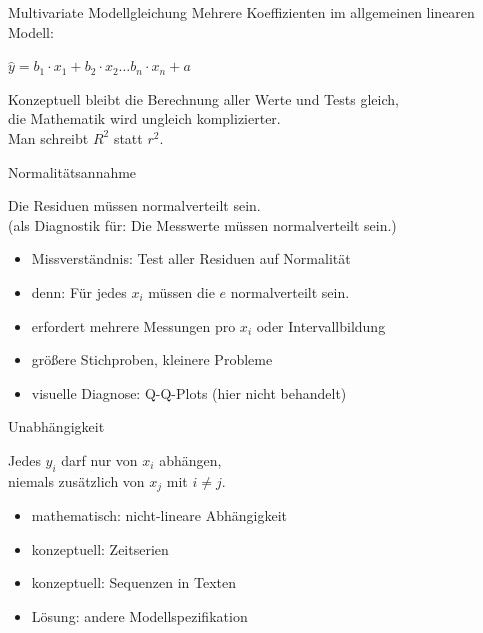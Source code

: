 \begin{frame}
  {Multivariate Modellgleichung}
  Mehrere Koeffizienten im \alert{allgemeinen linearen Modell}:\\
  \pause
  \vspace{0.5cm}
  \begin{center}
    \alert{$\hat{y}=b_1\cdot x_1+b_2\cdot x_2\dots b_n\cdot x_n+a$}
  \end{center}
  \vspace{0.5cm}
  \pause
  Konzeptuell bleibt die Berechnung aller Werte und Tests gleich,\\
  die Mathematik wird ungleich komplizierter.\\
  \vspace{0.5cm}
  \pause
  Man schreibt \alert{$R^2$} statt $r^2$.
\end{frame}

\begin{frame}
  {Normalitätsannahme}
  \begin{center}
    \alert{Die Residuen müssen normalverteilt sein.}\\
    (als Diagnostik für: \alert{Die Messwerte müssen normalverteilt sein.})
  \end{center}
  \begin{itemize}[<+->]
    \item Missverständnis: Test aller Residuen auf Normalität
    \item denn: \alert{Für jedes $x_i$ müssen die $e$ normalverteilt sein.}
    \item erfordert mehrere Messungen pro $x_i$ oder Intervallbildung 
    \item größere Stichproben, kleinere Probleme
    \item visuelle Diagnose: Q-Q-Plots (hier nicht behandelt)
  \end{itemize}
\end{frame}

\begin{frame}
  {Unabhängigkeit}
  \begin{center}
    \alert{Jedes $y_i$ darf nur von $x_i$ abhängen,\\
        niemals zusätzlich von $x_j$ mit $i\neq j$.}
  \end{center}
  \begin{itemize}[<+->]
    \item mathematisch: nicht-lineare Abhängigkeit
    \item konzeptuell: Zeitserien
    \item konzeptuell: Sequenzen in Texten
    \item Lösung: andere Modellspezifikation
  \end{itemize}
\end{frame}

